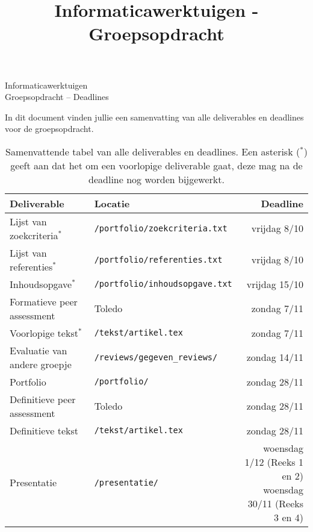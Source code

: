 \documentclass[a4paper]{article}
\title{Informaticawerktuigen - Groepsopdracht}
\begin{document}
\begin{center}
  \huge Informaticawerktuigen \\
  \Huge Groepsopdracht -- Deadlines
\end{center}
\vspace{1em}


In dit document vinden jullie een samenvatting van alle deliverables en deadlines voor de groepsopdracht.

\begin{table}[h]
    \renewcommand{\arraystretch}{1.5}
    \begin{center}
        \begin{tabular}{ l | l r }
            \rowcolor{gray!50}
            \textbf{Deliverable}            & \textbf{Locatie}                      & \textbf{Deadline} \\ \hline
            Lijst van zoekcriteria$^{\ast}$ & \texttt{/portfolio/zoekcriteria.txt}  & vrijdag 8/10 \\
            Lijst van referenties$^{\ast}$  & \texttt{/portfolio/referenties.txt}   & vrijdag 8/10 \\
            Inhoudsopgave$^{\ast}$          & \texttt{/portfolio/inhoudsopgave.txt} & vrijdag 15/10 \\
            Formatieve peer assessment      & Toledo                                & zondag 7/11 \\
            Voorlopige tekst$^{\ast}$       & \texttt{/tekst/artikel.tex}           & zondag 7/11 \\
            Evaluatie van andere groepje    & \texttt{/reviews/gegeven\_reviews/}   & zondag 14/11 \\
            Portfolio                       & \texttt{/portfolio/}                  & zondag 28/11 \\
            Definitieve peer assessment     & Toledo                                & zondag 28/11 \\
            Definitieve tekst               & \texttt{/tekst/artikel.tex}           & zondag 28/11 \\
            Presentatie                     & \texttt{/presentatie/}                & \makecell{woensdag 1/12 (Reeks 1 en 2) \\ woensdag 30/11 (Reeks 3 en 4)} \\
        \end{tabular}
        \caption{
            Samenvattende tabel van alle deliverables en deadlines.
            Een asterisk ($^{\ast}$) geeft aan dat het om een voorlopige deliverable gaat, deze mag na de deadline nog worden bijgewerkt.
        }
    \end{center}
\end{table}


\end{document}

